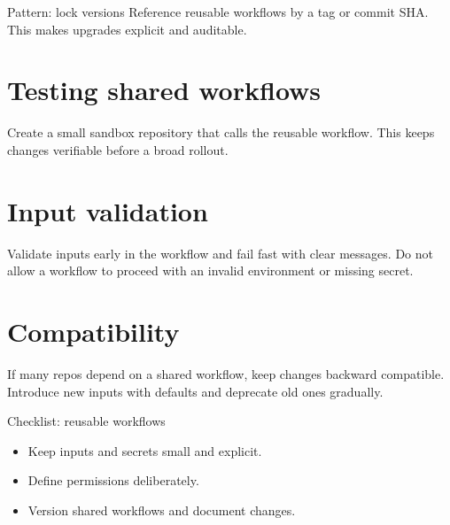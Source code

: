 \begin{patternbox}{Pattern: lock versions}
Reference reusable workflows by a tag or commit SHA.
This makes upgrades explicit and auditable.
\end{patternbox}

\section{Testing shared workflows}
Create a small sandbox repository that calls the reusable workflow.
This keeps changes verifiable before a broad rollout.

\section{Input validation}
Validate inputs early in the workflow and fail fast with clear messages.
Do not allow a workflow to proceed with an invalid environment or missing secret.

\section{Compatibility}
If many repos depend on a shared workflow, keep changes backward compatible.
Introduce new inputs with defaults and deprecate old ones gradually.

\begin{checklistbox}{Checklist: reusable workflows}
\begin{itemize}[nosep]
  \item Keep inputs and secrets small and explicit.
  \item Define permissions deliberately.
  \item Version shared workflows and document changes.
\end{itemize}
\end{checklistbox}
